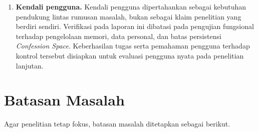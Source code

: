\begin{enumerate}[label=\arabic*.,leftmargin=*,itemsep=4pt]
  \item \textbf{Kendali pengguna.} Kendali pengguna dipertahankan sebagai kebutuhan pendukung lintas rumusan masalah, bukan sebagai klaim penelitian yang berdiri sendiri. Verifikasi pada laporan ini dibatasi pada pengujian fungsional terhadap pengelolaan memori, data personal, dan batas persistensi \textit{Confession Space}. Keberhasilan tugas serta pemahaman pengguna terhadap kontrol tersebut disiapkan untuk evaluasi pengguna nyata pada penelitian lanjutan.
\end{enumerate}

\section{Batasan Masalah}
\label{sec:batasan-masalah}

Agar penelitian tetap fokus, batasan masalah ditetapkan sebagai berikut.


